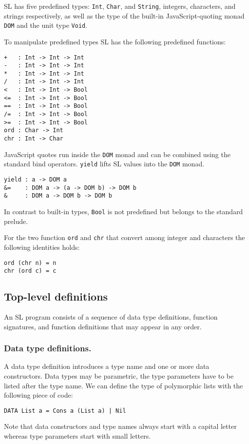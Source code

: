 \documentclass{article}
\begin{document}
SL has five predefined types: \verb|Int|, \verb|Char|, and
\verb|String|, integers, characters, and strings respectively, as well
as the type of the built-in JavaScript-quoting monad \verb|DOM| and
the unit type \verb|Void|.

To manipulate predefined types SL has the following predefined
functions:
\begin{verbatim}
+   : Int -> Int -> Int
-   : Int -> Int -> Int
*   : Int -> Int -> Int
/   : Int -> Int -> Int
<   : Int -> Int -> Bool
<=  : Int -> Int -> Bool
==  : Int -> Int -> Bool
/=  : Int -> Int -> Bool
>=  : Int -> Int -> Bool
ord : Char -> Int
chr : Int -> Char
\end{verbatim}
JavaScript quotes run inside the \verb|DOM| monad and can be combined
using the standard bind operators. \verb|yield| lifts SL values into
the \verb|DOM| monad.
\begin{verbatim}
yield : a -> DOM a
&=    : DOM a -> (a -> DOM b) -> DOM b
&     : DOM a -> DOM b -> DOM b
\end{verbatim}
In contrast to built-in types, \verb|Bool| is not predefined but
belongs to the standard prelude.

For the two function \verb|ord| and \verb|chr| that convert among
integer and characters the following identities holds:
\begin{verbatim}
ord (chr n) = n
chr (ord c) = c
\end{verbatim}


\subsection{Top-level definitions}
\label{sec:definitions}

An SL program consists of a sequence of data type definitions,
function signatures, and function definitions that may appear in any
order.

\subsubsection{Data type definitions.}
\label{sec:data-type-defin}

A data type definition introduces a type name and one or more data
constructors. Data types may be parametric, the type parameters have
to be listed after the type name. We can define the type of
polymorphic lists with the following piece of code:
\begin{verbatim}
DATA List a = Cons a (List a) | Nil
\end{verbatim}
Note that data constructors and type names always start with a capital
letter whereas type parameters start with small letters.
\end{document}
